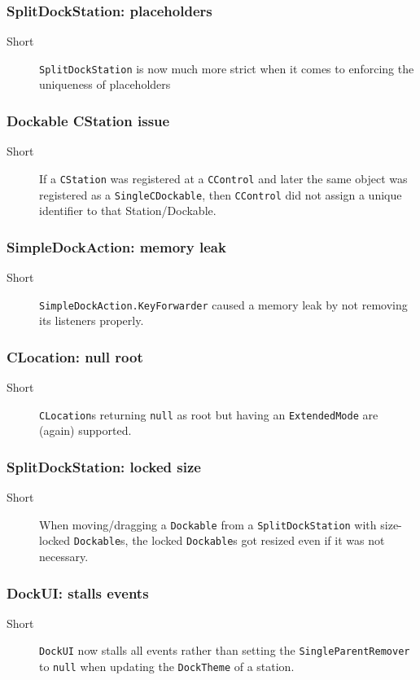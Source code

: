 \documentclass[a4paper,10pt]{article}
\newcommand{\src}[1]{\lstinline[basicstyle=\normalsize\ttfamily,keywordstyle=\normalsize\ttfamily,identifierstyle=\normalsize\ttfamily]|#1|}
\newcommand{\short}{\item[Short]}
\begin{document}
\subsubsection{SplitDockStation: placeholders}
\begin{description}
 \short \src{SplitDockStation} is now much more strict when it comes to enforcing the uniqueness of placeholders
\end{description}

\subsubsection{Dockable CStation issue}
\begin{description}
 \short If a \src{CStation} was registered at a \src{CControl} and later the same object was registered as a \src{SingleCDockable}, then \src{CControl} did not assign a unique identifier to that Station/Dockable. 
\end{description}

\subsubsection{SimpleDockAction: memory leak}
\begin{description}
 \short \src{SimpleDockAction.KeyForwarder} caused a memory leak by not removing its listeners properly.
\end{description}

\subsubsection{CLocation: null root}
\begin{description}
 \short \src{CLocation}s returning \src{null} as root but having an \src{ExtendedMode} are (again) supported.
\end{description}

\subsubsection{SplitDockStation: locked size}
\begin{description}
 \short When moving/dragging a \src{Dockable} from a \src{SplitDockStation} with size-locked \src{Dockable}s, the locked \src{Dockable}s got resized even if it was not necessary.
\end{description}

\subsubsection{DockUI: stalls events}
\begin{description}
 \short \src{DockUI} now stalls all events rather than setting the \linebreak \src{SingleParentRemover} to \src{null} when updating the \src{DockTheme} of a station.
\end{description}
\end{document}
